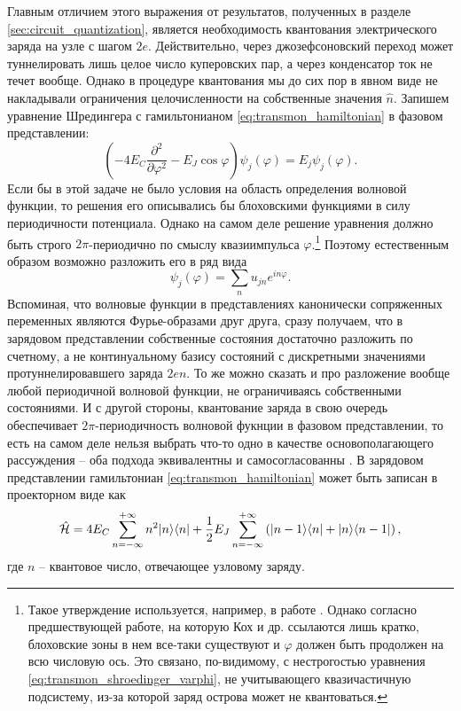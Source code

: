 \documentclass[14pt, a4paper]{extreport}
\DeclarePairedDelimiter\bra{\langle}{\rvert}
\DeclarePairedDelimiter\ket{\lvert}{\rangle}
\numberwithin{equation}{section}
\begin{document}
Главным отличием этого выражения от результатов, полученных в разделе \ref{sec:circuit_quantization}, является необходимость квантования электрического заряда на узле с шагом $2e$. Действительно, через джозефсоновский переход может туннелировать лишь целое число куперовских пар, а через конденсатор ток не течет вообще. Однако в процедуре квантования мы до сих пор в явном виде не накладывали ограничения целочисленности на собственные значения $\hat n$. Запишем уравнение Шредингера с гамильтонианом \eqref{eq:transmon_hamiltonian} в фазовом представлении:
\begin{equation}
	\left(- 4 E_C \frac{\partial^2}{\partial \varphi^2} - E_J \cos \varphi\right)\psi_j(\varphi) = E_j \psi_j(\varphi).\label{eq:transmon_shroedinger_varphi}
\end{equation}
Если бы в этой задаче не было условия на область определения волновой функции, то решения его описывались бы блоховскими функциями в силу периодичности потенциала. Однако на самом деле решение уравнения должно быть строго $2\pi$-периодично по смыслу квазиимпульса $\varphi$.\footnote{Такое утверждение используется, например, в работе \cite{koch2007charge}. Однако согласно предшествующей работе, на которую Кох и др. ссылаются лишь кратко, блоховские зоны в нем все-таки существуют \cite{averin1985bloch} и $\varphi$ должен быть продолжен на всю числовую ось. Это связано, по-видимому, с нестрогостью уравнения \eqref{eq:transmon_shroedinger_varphi}, не учитывающего квазичастичную подсистему, из-за которой заряд острова может не квантоваться.} Поэтому естественным образом возможно разложить его в ряд вида
\begin{equation}
	\psi_j (\varphi) = \sum_n u_{jn} e^{i n \varphi}.
\end{equation}
Вспоминая, что волновые функции в представлениях канонически сопряженных переменных являются Фурье-образами друг друга, сразу получаем, что в зарядовом представлении собственные состояния достаточно разложить по счетному, а не континуальному базису состояний с дискретными значениями протуннелировавшего заряда $2en$. То же можно сказать и про разложение вообще любой периодичной волновой функции, не ограничиваясь собственными состояниями. И с другой стороны, квантование заряда в свою очередь обеспечивает $2\pi$-периодичность волновой фукнции в фазовом представлении, то есть на самом деле нельзя выбрать что-то одно в качестве основополагающего рассуждения -- оба подхода эквивалентны и самосогласованны \cite{thuneberg2013, devoret1995quantum}. В зарядовом представлении гамильтониан \eqref{eq:transmon_hamiltonian} может быть записан в проекторном виде как \cite{devoret1995quantum}
\begin{equation}
	\hat{\mathcal{H}} = 4 E_C \sum_{n=-\infty}^{+\infty} n^2 \ket{n}\bra{n} + \frac{1}{2}E_J \sum_{n=-\infty}^{+\infty} \left( \ket{n-1}\bra{n} + \ket{n}\bra{n-1} \right),\label{eq:transmon_shroedinger_n}
\end{equation}
где $n$ -- квантовое число, отвечающее узловому заряду.
\end{document}
